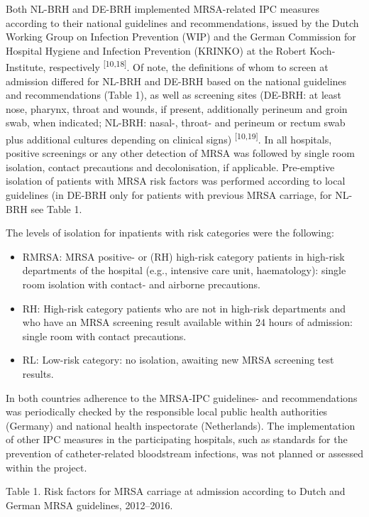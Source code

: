 \documentclass[
]{book}
\providecommand{\tightlist}{%
  \setlength{\itemsep}{0pt}\setlength{\parskip}{0pt}}
\begin{document}
Both NL-BRH and DE-BRH implemented MRSA-related IPC measures according to their national guidelines and recommendations, issued by the Dutch Working Group on Infection Prevention (WIP) and the German Commission for Hospital Hygiene and Infection Prevention (KRINKO) at the Robert Koch-Institute, respectively \textsuperscript{{[}10,18{]}}. Of note, the definitions of whom to screen at admission differed for NL-BRH and DE-BRH based on the national guidelines and recommendations (Table 1), as well as screening sites (DE-BRH: at least nose, pharynx, throat and wounds, if present, additionally perineum and groin swab, when indicated; NL-BRH: nasal-, throat- and perineum or rectum swab plus additional cultures depending on clinical signs) \textsuperscript{{[}10,19{]}}. In all hospitals, positive screenings or any other detection of MRSA was followed by single room isolation, contact precautions and decolonisation, if applicable. Pre-emptive isolation of patients with MRSA risk factors was performed according to local guidelines (in DE-BRH only for patients with previous MRSA carriage, for NL-BRH see Table 1.

The levels of isolation for inpatients with risk categories were the following:

\begin{itemize}
\tightlist
\item
  RMRSA: MRSA positive- or (RH) high-risk category patients in high-risk departments of the hospital (e.g., intensive care unit, haematology): single room isolation with contact- and airborne precautions.
\item
  RH: High-risk category patients who are not in high-risk departments and who have an MRSA screening result available within 24 hours of admission: single room with contact precautions.
\item
  RL: Low-risk category: no isolation, awaiting new MRSA screening test results.
\end{itemize}

In both countries adherence to the MRSA-IPC guidelines- and recommendations was periodically checked by the responsible local public health authorities (Germany) and national health inspectorate (Netherlands). The implementation of other IPC measures in the participating hospitals, such as standards for the prevention of catheter-related bloodstream infections, was not planned or assessed within the project.

Table 1. Risk factors for MRSA carriage at admission according to Dutch and German MRSA guidelines, 2012--2016.
\end{document}
